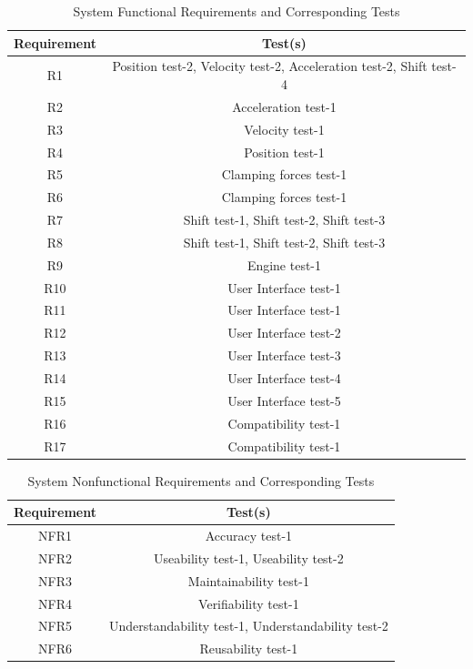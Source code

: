\documentclass[12pt, titlepage]{article}
\begin{document}
\begin{table}[H]
\centering
  \begin{tabular}{|c|c|}
    \hline
    \textbf{Requirement} & \textbf{Test(s)} \\ \hline
    R1 & Position test-2, Velocity test-2, Acceleration test-2, Shift test-4  \\ \hline
    R2 & Acceleration test-1 \\ \hline
    R3 & Velocity test-1 \\ \hline
    R4 & Position test-1 \\ \hline
    R5 & Clamping forces test-1 \\ \hline
    R6 & Clamping forces test-1 \\ \hline
    R7 & Shift test-1, Shift test-2, Shift test-3 \\ \hline
    R8 & Shift test-1, Shift test-2, Shift test-3 \\ \hline
    R9 & Engine test-1 \\ \hline
    R10 & User Interface test-1 \\ \hline
    R11 & User Interface test-1 \\ \hline
    R12 & User Interface test-2 \\ \hline
    R13 & User Interface test-3 \\ \hline
    R14 & User Interface test-4 \\ \hline
    R15 & User Interface test-5 \\ \hline
    R16 & Compatibility test-1 \\ \hline
    R17 & Compatibility test-1 \\ \hline
    \end{tabular}
    \caption{System Functional Requirements and Corresponding Tests}
    \label{tab:requirements_tests}
\end{table}

\begin{table}[h!]
  \centering
    \begin{tabular}{|c|c|}
      \hline
      \textbf{Requirement} & \textbf{Test(s)} \\ \hline
      NFR1 & Accuracy test-1  \\ \hline
      NFR2 & Useability test-1, Useability test-2 \\ \hline
      NFR3 & Maintainability test-1 \\ \hline
      NFR4 & Verifiability test-1 \\ \hline
      NFR5 & Understandability test-1, Understandability test-2 \\ \hline
      NFR6 & Reusability test-1 \\ \hline
      \end{tabular}
      \caption{System Nonfunctional Requirements and Corresponding Tests}
      \label{tab:requirements_tests}
  \end{table}
\end{document}
